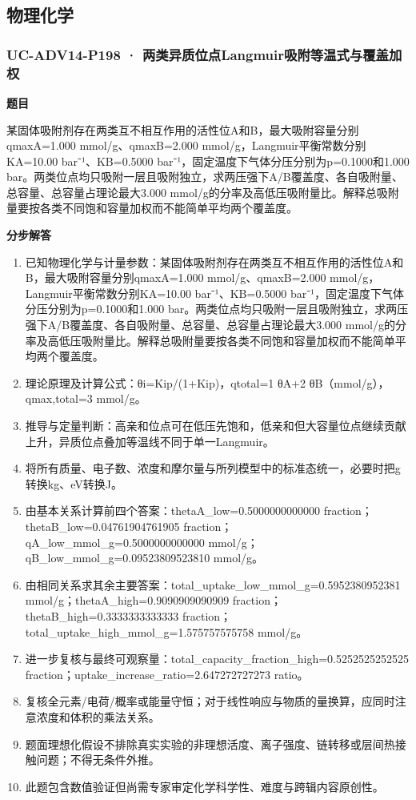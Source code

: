 \documentclass[UTF8,11pt,a4paper]{ctexart}
\begin{document}
\subsection*{物理化学}
\subsubsection*{UC-ADV14-P198 · 两类异质位点Langmuir吸附等温式与覆盖加权}
\noindent\textbf{题目}\par
某固体吸附剂存在两类互不相互作用的活性位A和B，最大吸附容量分别qmaxA=1.000 mmol/g、qmaxB=2.000 mmol/g，Langmuir平衡常数分别KA=10.00 bar⁻¹、KB=0.5000 bar⁻¹，固定温度下气体分压分别为p=0.1000和1.000 bar。两类位点均只吸附一层且吸附独立，求两压强下A/B覆盖度、各自吸附量、总容量、总容量占理论最大3.000 mmol/g的分率及高低压吸附量比。解释总吸附量要按各类不同饱和容量加权而不能简单平均两个覆盖度。\par
\medskip\noindent\textbf{分步解答}
\begin{enumerate}
\item 已知物理化学与计量参数：某固体吸附剂存在两类互不相互作用的活性位A和B，最大吸附容量分别qmaxA=1.000 mmol/g、qmaxB=2.000 mmol/g，Langmuir平衡常数分别KA=10.00 bar⁻¹、KB=0.5000 bar⁻¹，固定温度下气体分压分别为p=0.1000和1.000 bar。两类位点均只吸附一层且吸附独立，求两压强下A/B覆盖度、各自吸附量、总容量、总容量占理论最大3.000 mmol/g的分率及高低压吸附量比。解释总吸附量要按各类不同饱和容量加权而不能简单平均两个覆盖度。
\item 理论原理及计算公式：θi=Kip/(1+Kip)，qtotal=1 θA+2 θB（mmol/g），qmax,total=3 mmol/g。
\item 推导与定量判断：高亲和位点可在低压先饱和，低亲和但大容量位点继续贡献上升，异质位点叠加等温线不同于单一Langmuir。
\item 将所有质量、电子数、浓度和摩尔量与所列模型中的标准态统一，必要时把g转换kg、eV转换J。
\item 由基本关系计算前四个答案：thetaA\_low=0.5000000000000 fraction；thetaB\_low=0.04761904761905 fraction；qA\_low\_mmol\_g=0.5000000000000 mmol/g；qB\_low\_mmol\_g=0.09523809523810 mmol/g。
\item 由相同关系求其余主要答案：total\_uptake\_low\_mmol\_g=0.5952380952381 mmol/g；thetaA\_high=0.9090909090909 fraction；thetaB\_high=0.3333333333333 fraction；total\_uptake\_high\_mmol\_g=1.575757575758 mmol/g。
\item 进一步复核与最终可观察量：total\_capacity\_fraction\_high=0.5252525252525 fraction；uptake\_increase\_ratio=2.647272727273 ratio。
\item 复核全元素/电荷/概率或能量守恒；对于线性响应与物质的量换算，应同时注意浓度和体积的乘法关系。
\item 题面理想化假设不排除真实实验的非理想活度、离子强度、链转移或层间热接触问题；不得无条件外推。
\item 此题包含数值验证但尚需专家审定化学科学性、难度与跨辑内容原创性。
\end{enumerate}
\end{document}
